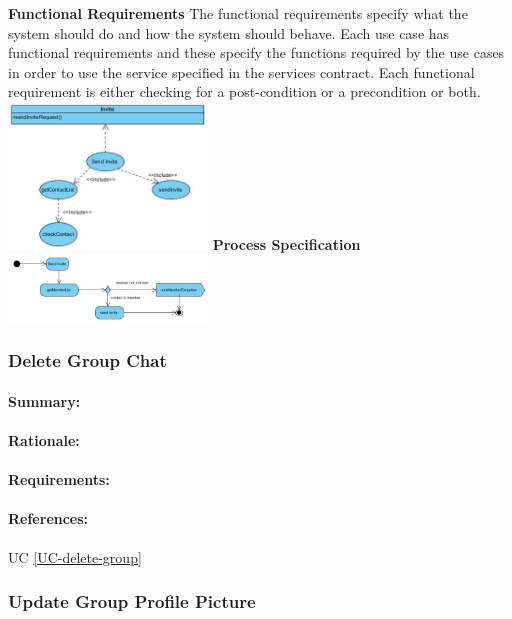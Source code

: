 \documentclass[11pt]{article}
\begin{document}
\textbf{Functional Requirements}\newline
 The functional requirements specify what the system should do and how the system should behave. Each use case has functional requirements and these specify the functions required by the use cases in order to use the service specified in the services contract. Each functional requirement is either checking for a post-condition or a precondition or both.\newline
 \newline
\includegraphics[width=200px]{./images/FR-sendInvite.jpg}
 \newline
\textbf{Process Specification} \newline
 \newline
 \includegraphics[width=200px]{./images/process-sendInvite.jpg}
  \newline
 
\subsubsection{Delete Group Chat} \label{FR-delete-group}
\paragraph{Summary:}
\paragraph{Rationale:}
\paragraph{Requirements:}
\paragraph{References:} UC \ref{UC-delete-group}

\subsubsection{Update Group Profile Picture} \label{FR-update-group-picture}
\end{document}
